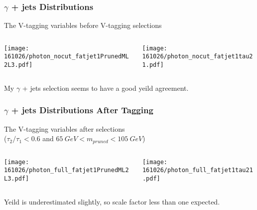 \documentclass{beamer}
\begin{document}
\begin{frame}
  \frametitle{$\gamma$ + jets Distributions}
  The V-tagging variables before V-tagging selections
  \begin{columns}
    \begin{column}{0.5\linewidth}
      \centering
      \texttt{[image: 161026/photon\_nocut\_fatjet1PrunedML2L3.pdf]}
    \end{column}
    \begin{column}{0.5\linewidth}
      \centering
      \texttt{[image: 161026/photon\_nocut\_fatjet1tau21.pdf]}
    \end{column}
  \end{columns}
  My $\gamma$ + jets selection seems to have a good yeild agreement.
\end{frame}

\begin{frame}
  \frametitle{$\gamma$ + jets Distributions After Tagging}
  The V-tagging variables after selections \\
  ($\tau_2/\tau_1 < 0.6$ and $\SI{65}{GeV} < m_{pruned} < \SI{105}{GeV}$)
  \begin{columns}
    \begin{column}{0.5\linewidth}
      \centering
      \texttt{[image: 161026/photon\_full\_fatjet1PrunedML2L3.pdf]}
    \end{column}
    \begin{column}{0.5\linewidth}
      \centering
      \texttt{[image: 161026/photon\_full\_fatjet1tau21.pdf]}
    \end{column}
  \end{columns}
  Yeild is underestimated slightly, so scale factor less than one expected.
\end{frame}
\end{document}
